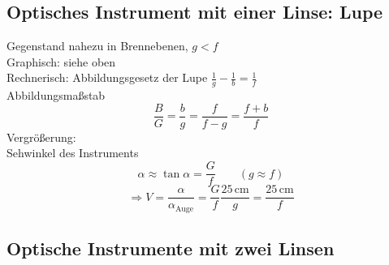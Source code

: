 \documentclass[titlepage,11pt,a4paper,ngerman]{report}
\newcommand{\tx}[1]{\textrm{#1}}
\begin{document}
\subsection{Optisches Instrument mit einer Linse: Lupe}


Gegenstand nahezu in Brennebenen, $ g < f $\\
Graphisch: siehe oben\\
Rechnerisch: Abbildungsgesetz der Lupe $ \frac{1}{g} - \frac{1}{b} = \frac{1}{f} $\\
Abbildungsmaßstab
\begin{equation*}
\frac{B}{G} = \frac{b}{g} = \frac{f}{f-g} = \frac{f+b}{f}
\end{equation*}
Vergrößerung:\\
Sehwinkel des Instruments
\begin{equation*}
\alpha \approx \tan \alpha = \frac{G}{f} \qquad (g \approx f)
\end{equation*}
\begin{equation*}
\Rightarrow V = \frac{\alpha}{\alpha_{\tx{Auge}}} = \frac{G}{f} \frac{25 \, \tx{cm}}{g} = \frac{25 \, \tx{cm}}{f}
\end{equation*}

\subsection{Optische Instrumente mit zwei Linsen}
\end{document}
